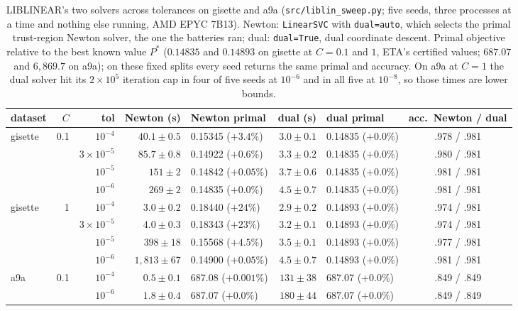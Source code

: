\documentclass[pdflatex,sn-apa]{sn-jnl}%
\theoremstyle{thmstyleone}
\theoremstyle{thmstyletwo}
\begin{document}


\begin{table}\centering\scriptsize
\caption{LIBLINEAR's two solvers across tolerances on gisette and
a9a (\texttt{src/liblin\_sweep.py}; five seeds, three processes at a
time and nothing else running, AMD EPYC 7B13). Newton: \texttt{LinearSVC}
with \texttt{dual=\textquotesingle auto\textquotesingle}, which selects
the primal trust-region Newton solver, the one the batteries ran; dual:
\texttt{dual=True}, dual coordinate descent. Primal objective relative
to the best known value $P^*$ ($0.14835$ and $0.14893$ on gisette at
$C{=}0.1$ and $1$, ETA's certified values; $687.07$ and $6{,}869.7$ on
a9a); on these fixed splits every seed returns the same primal and
accuracy. On a9a at $C{=}1$ the dual solver hit its $2\times10^5$
iteration cap in four of five seeds at $10^{-6}$ and in all five at
$10^{-8}$, so those times are lower bounds.}\label{tab:libdef}
\begin{tabular}{lrrrlrlc}\toprule
dataset & $C$ & tol & Newton (s) & Newton primal & dual (s) & dual primal & acc.\ Newton / dual \\\midrule
gisette & 0.1 & $10^{-4}$ & $40.1\pm0.5$ & 0.15345 ($+3.4\%$) & $3.0\pm0.1$ & 0.14835 ($+0.0\%$) & .978 / .981 \\
 & & $3\times10^{-5}$ & $85.7\pm0.8$ & 0.14922 ($+0.6\%$) & $3.3\pm0.2$ & 0.14835 ($+0.0\%$) & .980 / .981 \\
 & & $10^{-5}$ & $151\pm2$ & 0.14842 ($+0.05\%$) & $3.7\pm0.6$ & 0.14835 ($+0.0\%$) & .981 / .981 \\
 & & $10^{-6}$ & $269\pm2$ & 0.14835 ($+0.0\%$) & $4.5\pm0.7$ & 0.14835 ($+0.0\%$) & .981 / .981 \\
gisette & 1 & $10^{-4}$ & $3.0\pm0.2$ & 0.18440 ($+24\%$) & $2.9\pm0.2$ & 0.14893 ($+0.0\%$) & .974 / .981 \\
 & & $3\times10^{-5}$ & $4.0\pm0.3$ & 0.18343 ($+23\%$) & $3.2\pm0.1$ & 0.14893 ($+0.0\%$) & .974 / .981 \\
 & & $10^{-5}$ & $398\pm18$ & 0.15568 ($+4.5\%$) & $3.5\pm0.1$ & 0.14893 ($+0.0\%$) & .977 / .981 \\
 & & $10^{-6}$ & $1{,}813\pm67$ & 0.14900 ($+0.05\%$) & $4.5\pm0.7$ & 0.14893 ($+0.0\%$) & .981 / .981 \\
\midrule
a9a & 0.1 & $10^{-4}$ & $0.5\pm0.1$ & 687.08 ($+0.001\%$) & $131\pm38$ & 687.07 ($+0.0\%$) & .849 / .849 \\
 & & $10^{-6}$ & $1.8\pm0.4$ & 687.07 ($+0.0\%$) & $180\pm44$ & 687.07 ($+0.0\%$) & .849 / .849 \\

\end{tabular}
\end{table}
\end{document}
